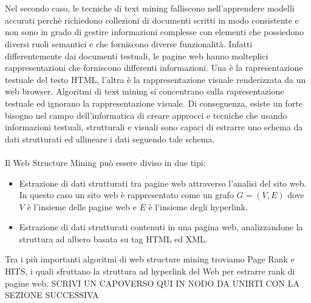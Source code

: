 \\\\
Nel secondo caso, le tecniche di text mining falliscono nell’apprendere modelli accurati perchè richiedono collezioni di documenti scritti in modo consistente e non sono in grado di gestire informazioni complesse con elementi che possiedono diversi ruoli semantici e che forniscono diverse funzionalità. Infatti differentemente dai documenti testuali, le pagine web hanno molteplici rappresentazioni che forniscono differenti informazioni. Una è la rapresentazione testuale del testo HTML, l’altra è la rappresentazione visuale renderizzata da un web browser. Algoritmi di text mining si concentrano sulla rapresentazione testuale ed ignorano la rappresentazione visuale. Di conseguenza, esiste un forte bisogno nel campo dell’informatica di creare approcci e tecniche che usando informazioni testuali, strutturali e visuali sono capaci di estrarre uno schema da dati strutturati ed allineare i dati seguendo tale schema.
\\\\
Il Web Structure Mining può essere diviso in due tipi:
\begin{itemize}
\item Estrazione di dati strutturati tra pagine web attraverso l'analisi del sito web. In questo caso un sito web è rappresentato come un grafo $G = (V, E)$ dove $V$ è l'insieme delle pagine web e $E$ è l'insieme degli hyperlink.
\item Estrazione di dati strutturati contenuti in una pagina web, analizzandone la struttura ad albero basata su tag HTML ed XML.
\end{itemize}
Tra i più importanti algoritmi di web structure mining troviamo Page Rank\cite{} e HITS\cite{}, i quali sfruttano la struttura ad hyperlink del Web per estrarre rank di pagine web.
\color{red}
SCRIVI UN CAPOVERSO QUI IN NODO DA UNIRTI CON LA SEZIONE SUCCESSIVA
\color{black}
